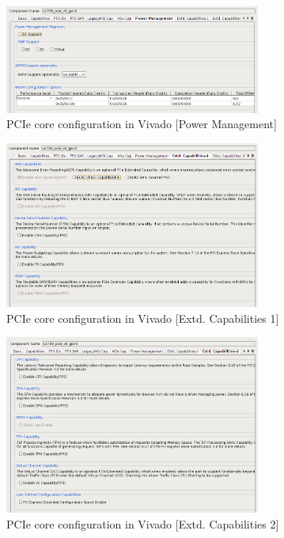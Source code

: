 \begin{figure}[H]
\centering
\includegraphics[width=0.75\textwidth]{figures/pcie_core_pwr.png}
\caption{PCIe core configuration in Vivado [Power Management]}
\label{fig:pcie_core_config7}
\end{figure}

\begin{figure}[H]
\centering
\includegraphics[width=0.75\textwidth]{figures/pcie_core_extcapa1.png}
\caption{PCIe core configuration in Vivado [Extd. Capabilities 1]}
\label{fig:pcie_core_config8}
\end{figure}
\newpage
\begin{figure}[H]
\centering
\includegraphics[width=0.75\textwidth]{figures/pcie_core_extcapa2.png}
\caption{PCIe core configuration in Vivado [Extd. Capabilities 2]}
\label{fig:pcie_core_config9}
\end{figure}


